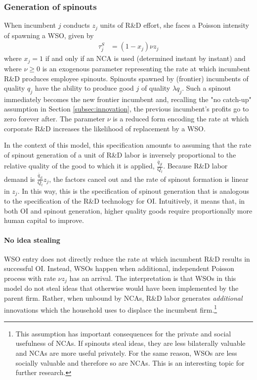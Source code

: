 \documentclass[11pt,english]{article}
\begin{document}
\subsubsection{Generation of spinouts}\label{subsubsec:generation_of_spinouts}

When incumbent $j$ conducts $z_j$ units of R\&D effort, she faces a Poisson intensity of spawning a WSO, given by 
\begin{align}
	\tau^S_j &= (1-x_{j}) \nu z_j \label{def:tau_S}
\end{align} 
where $x_{j} = 1$ if and only if an NCA is used (determined instant by instant) and where $\nu \ge 0$ is an exogenous parameter representing the rate at which incumbent R\&D produces employee spinouts. Spinouts spawned by (frontier) incumbents of quality $q_j$ have the ability to produce good $j$ of quality $\lambda q_j$. Such a spinout immediately becomes the new frontier incumbent and, recalling the "no catch-up" assumption in Section \ref{subsec:innovation}, the previous incumbent's profits go to zero forever after. The parameter $\nu$ is a reduced form encoding the rate at which corporate R\&D increases the likelihood of replacement by a WSO.

In the context of this model, this specification amounts to assuming that the rate of spinout generation of a unit of R\&D labor is inversely proportional to the relative quality of the good to which it is applied, $\frac{\bar{q}_{jt}}{Q_t}$. Because R\&D labor demand is $\frac{\bar{q}_{jt}}{Q_t} z_j$, the factors cancel out and the rate of spinout formation is linear in $z_j$. In this way, this is the specification of spinout generation that is analogous to the specification of the R\&D technology for OI. Intuitively, it means that, in both OI and spinout generation, higher quality goods require proportionally more human capital to improve.

\paragraph{No idea stealing} WSO entry does not directly reduce the rate at which incumbent R\&D results in successful OI. Instead, WSOs happen when additional, independent Poisson process with rate $\nu z_j$ has an arrival. The interpretation is that WSOs in this model do not steal ideas that otherwise would have been implemented by the parent firm. Rather, when unbound by NCAs, R\&D labor generates \textit{additional} innovations which the household uses to displace the incumbent firm.\footnote{This assumption has important consequences for the private and social usefulness of NCAs. If spinouts steal ideas, they are less bilaterally valuable and NCAs are more useful privately. For the same reason, WSOs are less socially valuable and therefore so are NCAs. This is an interesting topic for further research.}
\end{document}
